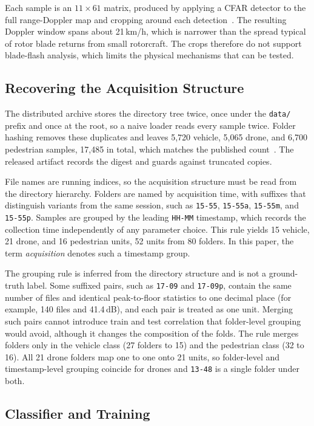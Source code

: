 \documentclass[conference]{IEEEtran}
\begin{document}
Each sample is an $11 \times 61$ matrix, produced by applying a CFAR detector to the full range-Doppler map and cropping around each detection~\cite{roldan2020,liaquat2024tut}. The resulting Doppler window spans about 21\,km/h, which is narrower than the spread typical of rotor blade returns from small rotorcraft. The crops therefore do not support blade-flash analysis, which limits the physical mechanisms that can be tested.

\subsection{Recovering the Acquisition Structure}

The distributed archive stores the directory tree twice, once under the \texttt{data/} prefix and once at the root, so a naive loader reads every sample twice. Folder hashing removes these duplicates and leaves 5,720 vehicle, 5,065 drone, and 6,700 pedestrian samples, 17,485 in total, which matches the published count~\cite{zhang2025}. The released artifact records the digest and guards against truncated copies.

File names are running indices, so the acquisition structure must be read from the directory hierarchy. Folders are named by acquisition time, with suffixes that distinguish variants from the same session, such as \texttt{15-55}, \texttt{15-55a}, \texttt{15-55m}, and \texttt{15-55p}. Samples are grouped by the leading \texttt{HH-MM} timestamp, which records the collection time independently of any parameter choice. This rule yields 15 vehicle, 21 drone, and 16 pedestrian units, 52 units from 80 folders. In this paper, the term \emph{acquisition} denotes such a timestamp group.

The grouping rule is inferred from the directory structure and is not a ground-truth label. Some suffixed pairs, such as \texttt{17-09} and \texttt{17-09p}, contain the same number of files and identical peak-to-floor statistics to one decimal place (for example, 140 files and 41.4\,dB), and each pair is treated as one unit. Merging such pairs cannot introduce train and test correlation that folder-level grouping would avoid, although it changes the composition of the folds. The rule merges folders only in the vehicle class (27 folders to 15) and the pedestrian class (32 to 16). All 21 drone folders map one to one onto 21 units, so folder-level and timestamp-level grouping coincide for drones and \texttt{13-48} is a single folder under both.

\subsection{Classifier and Training}
\end{document}

